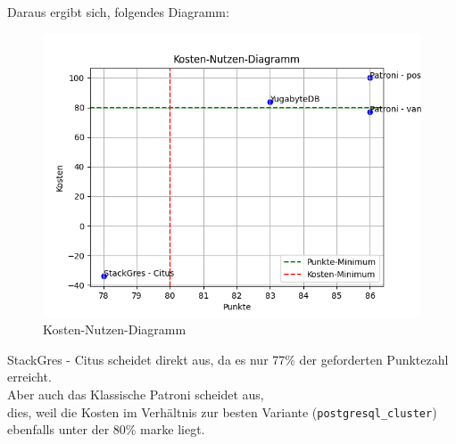 \begin{flushleft}
    Daraus ergibt sich, folgendes Diagramm:
    \begin{figure}[H]
        \centering
        \includegraphics[width=1\linewidth]{source/cost_benefit_diagram/cost_benefit_diagram}
        \caption{Kosten-Nutzen-Diagramm}
        \label{fig:cost_benefit_diagram}
    \end{figure}
    StackGres - Citus scheidet direkt aus, da es nur 77\% der geforderten Punktezahl erreicht.\\
    Aber auch das Klassische Patroni scheidet aus,\\
    dies, weil die Kosten im Verhältnis zur besten Variante (\texttt{postgresql\_cluster}) ebenfalls unter der 80\%  marke liegt.
\end{flushleft}